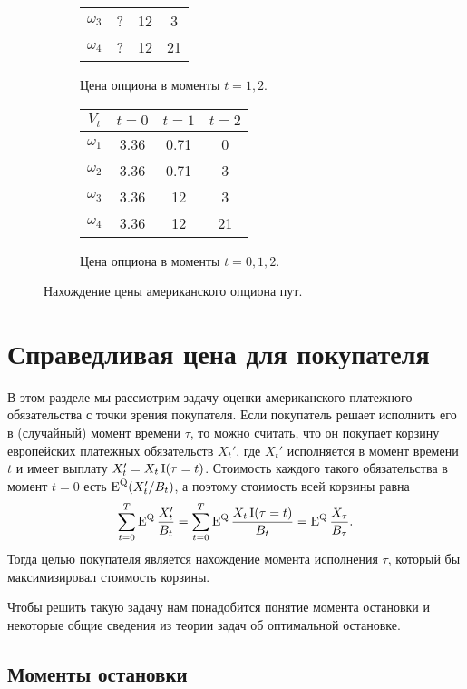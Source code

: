 \begin{example}
\begin{figure}[h]
\begin{subfigure}{0.45\textwidth}
\begin{tabular}{c|ccc}
    $\omega_3$ & ? &12 &3\\
    $\omega_4$ & ? &12 &21\\
  \end{tabular}
  \caption{Цена опциона в моменты $t=1,2$.}
  \label{5:fig-put-price-3}
\end{subfigure}
\par\vspace{5mm}\par
\begin{subfigure}{0.45\textwidth}
  \centering
  \begin{tabular}{c|ccc}
    $V_t$ & $t=0$ & $t=1$ & $t=2$\\\hline
    $\omega_1$ & 3.36 &0.71 &0\\
    $\omega_2$ & 3.36 &0.71 &3\\
    $\omega_3$ & 3.36 &12 &3\\
    $\omega_4$ & 3.36 &12 &21\\
  \end{tabular}
  \caption{Цена опциона в моменты $t=0,1,2$.}
  \label{5:fig-put-price-4}
\end{subfigure}
\caption{Нахождение цены американского опциона пут.}
\label{5:fig-put-price}
\end{figure}
\end{example}


\section{Справедливая цена для покупателя}

В этом разделе мы рассмотрим задачу оценки американского платежного обязательства с точки зрения покупателя.
Если покупатель решает исполнить его в (случайный) момент времени $\tau$, то можно считать, что он покупает корзину европейских платежных обязательств $X_t'$, где $X_t'$ исполняется в момент времени $t$ и имеет выплату $X_t' = X_t \operatorname{I}(\tau=t)$.
Стоимость каждого такого обязательства в момент $t=0$ есть $\operatorname{E}^{\mathrm{Q}}(X_t'/B_t)$, а поэтому стоимость всей корзины равна
\[
\sum_{t=0}^T \operatorname{E}^{\mathrm{Q}} \frac{X_t'}{B_t} = \sum_{t=0}^T \operatorname{E}^{\mathrm{Q}} \frac{X_t \operatorname{I}(\tau=t)}{B_t}
= \operatorname{E}^{\mathrm{Q}} \frac{X_\tau}{B_\tau}.
\]
Тогда целью покупателя является нахождение момента исполнения $\tau$, который бы максимизировал стоимость корзины.

Чтобы решить такую задачу нам понадобится понятие момента остановки и некоторые общие сведения из теории задач об оптимальной остановке.


\subsection{Моменты остановки}

